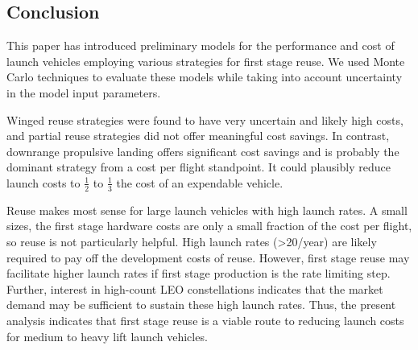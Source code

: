 \documentclass[conf]{new-aiaa}
\begin{document}
\begin{multicols}{2}
\section{Conclusion}

This paper has introduced preliminary models for the performance and cost of launch vehicles employing various strategies for first stage reuse. We used Monte Carlo techniques to evaluate these models while taking into account uncertainty in the model input parameters.

Winged reuse strategies were found to have very uncertain and likely high costs, and partial reuse strategies did not offer meaningful cost savings. In contrast, downrange propulsive landing offers significant cost savings and is probably the dominant strategy from a cost per flight standpoint. It could plausibly reduce launch costs to $\frac{1}{2}$ to $\frac{1}{3}$ the cost of an expendable vehicle.

Reuse makes most sense for large launch vehicles with high launch rates. A small sizes, the first stage hardware costs are only a small fraction of the cost per flight, so reuse is not particularly helpful. High launch rates (>20/year) are likely required to pay off the development costs of reuse. However, first stage reuse may facilitate higher launch rates if first stage production is the rate limiting step. Further, interest in high-count LEO constellations indicates that the market demand may be sufficient to sustain these high launch rates. Thus, the present analysis indicates that first stage reuse is a viable route to reducing launch costs for medium to heavy lift launch vehicles.


\end{multicols}
\end{document}
